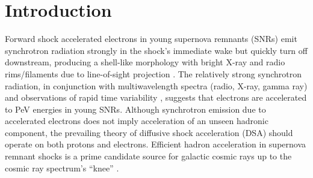 \documentclass[iop, apj, numberedappendix]{emulateapj}
\begin{document}



\section{Introduction} \label{sec:intro}

Forward shock accelerated electrons in young supernova remnants (SNRs) emit
synchrotron radiation strongly in the shock's immediate wake but quickly turn
off downstream, producing a shell-like morphology with bright X-ray and radio
rims/filaments due to line-of-sight projection \citep{koyama1995}.  The
relatively strong synchrotron radiation, in conjunction with multiwavelength
spectra (radio, X-ray, gamma ray) \citep{aharonian2004, acero2010,
ackermann2013} and observations of rapid time variability \citep{uchiyama2007},
suggests that electrons are accelerated to PeV energies in young SNRs.
Although synchrotron emission due to accelerated electrons does not imply
acceleration of an unseen hadronic component, the prevailing theory of
diffusive shock acceleration (DSA) should operate on both protons and
electrons.  Efficient hadron acceleration in supernova remnant shocks is a
prime candidate source for galactic cosmic rays up to the cosmic ray spectrum's
``knee'' \citep{vink2012}.
\end{document}
